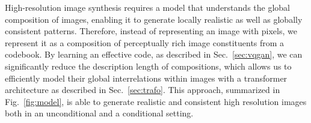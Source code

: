 \documentclass[final]{cvpr}
\begin{document}
High-resolution image synthesis requires a model
that understands the global composition of images, enabling it to
generate locally realistic as well as globally consistent patterns.
%
%
Therefore, instead of representing an image with pixels, we represent it
as a composition of perceptually rich image constituents from a codebook.  By
learning an effective code, as described in Sec.~\ref{sec:vqgan}, we can
significantly reduce the description length of compositions, which allows us to
efficiently model their global interrelations within images with a transformer
architecture as described in
Sec.~\ref{sec:trafo}. This approach, summarized in Fig.~\ref{fig:model}, is
able to generate realistic and consistent high resolution
images both in an unconditional and a conditional setting.
%

\newcommand{\codebookdim}{n_z}
%
\end{document}
